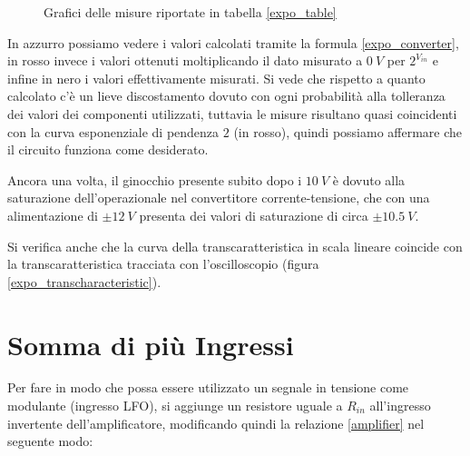 \begin{figure}[H]
\begin{subfigure}{.5\textwidth}
    \end{subfigure}

    \caption{Grafici delle misure riportate in tabella \ref{expo_table}}
    \label{expo_graphs}
\end{figure}

In azzurro possiamo vedere i valori calcolati tramite la formula \ref{expo_converter},
in rosso invece i valori ottenuti moltiplicando il dato misurato a $0\ V$ per $2^{V_{in}}$
e infine in nero i valori effettivamente misurati. Si vede che rispetto a quanto calcolato
c'è un lieve discostamento dovuto con ogni probabilità alla tolleranza dei valori dei
componenti utilizzati, tuttavia le misure risultano quasi coincidenti con la curva esponenziale
di pendenza $2$ (in rosso), quindi possiamo affermare che il circuito funziona come desiderato.

Ancora una volta, il ginocchio presente subito dopo i $10\ V$ è dovuto alla saturazione
dell'operazionale nel convertitore corrente-tensione, che con una alimentazione di $\pm12\ V$
presenta dei valori di saturazione di circa $\pm10.5\ V$.

Si verifica anche che la curva della transcaratteristica in scala lineare coincide con la
transcaratteristica tracciata con l'oscilloscopio (figura \ref{expo_transcharacteristic}).


\section{Somma di più Ingressi}


Per fare in modo che possa essere utilizzato un segnale in tensione come modulante (ingresso
LFO), si aggiunge un resistore uguale a $R_{in}$ all'ingresso invertente dell'amplificatore,
modificando quindi la relazione \ref{amplifier} nel seguente modo:

